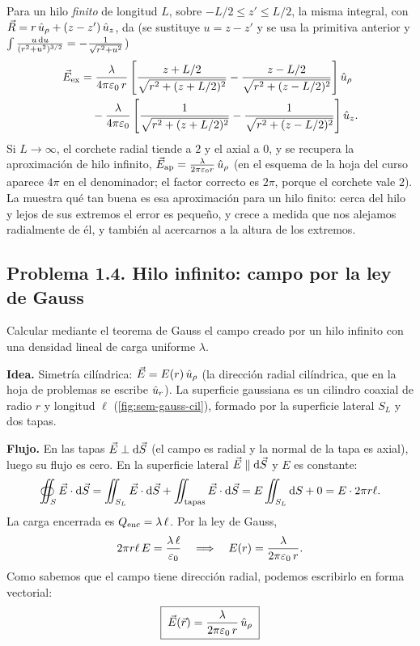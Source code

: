 \begin{observacion}\label{obs:hilo-finito}
Para un hilo \emph{finito} de longitud $L$, sobre $-L/2\le z'\le L/2$, la misma integral, con $\vec{R}=r\,\hat{u}_{\rho}+(z-z')\,\hat{u}_{z}$, da (se sustituye $u=z-z'$ y se usa la primitiva anterior y $\int\frac{u\,\mathrm{d} u}{(r^{2}+u^{2})^{3/2}}=-\frac{1}{\sqrt{r^{2}+u^{2}}}$)
\begin{align*}
  \vec{E}_{\mathrm{ex}}&=\frac{\lambda}{4\pi\varepsilon_{0}\,r}\left[\frac{z+L/2}{\sqrt{r^{2}+(z+L/2)^{2}}}-\frac{z-L/2}{\sqrt{r^{2}+(z-L/2)^{2}}}\right]\hat{u}_{\rho}\\
  &\quad-\frac{\lambda}{4\pi\varepsilon_{0}}\left[\frac{1}{\sqrt{r^{2}+(z+L/2)^{2}}}-\frac{1}{\sqrt{r^{2}+(z-L/2)^{2}}}\right]\hat{u}_{z} .
\end{align*}
Si $L\to\infty$, el corchete radial tiende a $2$ y el axial a $0$, y se recupera la aproximación de hilo infinito, $\vec{E}_{\mathrm{ap}}=\frac{\lambda}{2\pi\varepsilon_{0} r}\,\hat{u}_{\rho}$ (en el esquema de la hoja del curso aparece $4\pi$ en el denominador;
el factor correcto es $2\pi$, porque el corchete vale $2$). La  muestra qué tan buena es esa aproximación para un hilo finito: cerca del hilo y lejos de sus extremos el error es pequeño, y crece a medida que nos
alejamos radialmente de él, y también al acercarnos a la altura de los extremos.
\end{observacion}



\subsection{Problema 1.4. Hilo infinito: campo por la ley de Gauss}\label{sem:hilo-gauss}
\begin{ejercicio}\label{ejer:hilo-gauss}
Calcular mediante el teorema de Gauss el campo creado por un hilo infinito con una densidad lineal de carga uniforme $\lambda$.
\end{ejercicio}

\begin{resolucion}
\textbf{Idea.} Simetría cilíndrica: $\vec{E}=E(r)\,\hat{u}_{\rho}$ (la dirección radial cilíndrica, que en la hoja de problemas se escribe $\hat{u}_{r}$). La superficie gaussiana es un cilindro coaxial de radio $r$ y longitud $\ell$
(\cref{fig:sem-gauss-cil}), formado por la superficie lateral $S_L$ y dos tapas.

\textbf{Flujo.} En las tapas $\vec{E}\perp\mathrm{d}\vec{S}$ (el campo es radial y la normal de la tapa es axial), luego su flujo es cero. En la superficie lateral $\vec{E}\parallel\mathrm{d}\vec{S}$ y $E$ es constante:
\[
  \oiint_{S}\vec{E}\cdot\mathrm{d}\vec{S}=\iint_{S_L}\vec{E}\cdot\mathrm{d}\vec{S}+\iint_{\text{tapas}}\vec{E}\cdot\mathrm{d}\vec{S}=E\iint_{S_L}\mathrm{d} S+0=E\cdot2\pi r\ell .
\]
La carga encerrada es $Q_{\mathrm{enc}}=\lambda\,\ell$. Por la ley de Gauss,
\[
  2\pi r\ell\,E=\frac{\lambda\,\ell}{\varepsilon_{0}}\quad\Longrightarrow\quad E(r)=\frac{\lambda}{2\pi\varepsilon_{0}\,r}.
\]
Como sabemos que el campo tiene dirección radial, podemos escribirlo en forma vectorial:
\[
  \boxed{\;\vec{E}(\vec{r})=\frac{\lambda}{2\pi\varepsilon_{0}\,r}\,\hat{u}_{\rho}\;}
\]
\end{resolucion}

